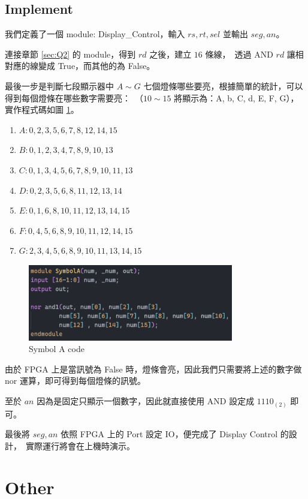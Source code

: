 \documentclass[10.5pt,compsoc,UTF8]{CjC}
\theoremstyle{mystyle}
\begin{document}
\subsection{Implement}
我們定義了一個 module: Display\_Control，輸入 $rs, rt, sel$ 並輸出 $seg, an$。\ 
\par
連接章節 \ref{sec:Q2} 的 module，得到 $rd$ 之後，建立 $16$ 條線，\
透過 AND $rd$ 讓相對應的線變成 True，而其他的為 False。
\par
最後一步是判斷七段顯示器中 $A \sim G$ 七個燈條哪些要亮，根據簡單的統計，可以得到每個燈條在哪些數字需要亮：\
（$10 \sim 15$ 將顯示為：A, b, C, d, E, F, G），實作程式碼如圖 \ref{fig:SymbolA}。
\begin{enumerate}
  \item $A: 0, 2, 3, 5, 6, 7, 8, 12, 14, 15$
  \item $B: 0, 1, 2, 3, 4, 7, 8, 9, 10, 13$
  \item $C: 0, 1, 3, 4, 5, 6, 7, 8, 9, 10, 11, 13$
  \item $D: 0, 2, 3, 5, 6, 8, 11, 12, 13, 14$
  \item $E: 0, 1, 6, 8, 10, 11, 12, 13, 14, 15$
  \item $F: 0, 4, 5, 6, 8, 9, 10, 11, 12, 14, 15$
  \item $G: 2, 3, 4, 5, 6, 8, 9, 10, 11, 13, 14, 15$ 
\end{enumerate}

\begin{figure}[h]
    \centering
    \includegraphics[width=0.8\textwidth]{SymbolA.png}
    \caption{Symbol A code}
    \label{fig:SymbolA}
\end{figure}

由於 FPGA 上是當訊號為 False 時，燈條會亮，因此我們只需要將上述的數字做 nor 運算，即可得到每個燈條的訊號。

至於 $an$ 因為是固定只顯示一個數字，因此就直接使用 AND 設定成 $1110_{(2)}$ 即可。


最後將 $seg, an$ 依照 FPGA 上的 Port 設定 IO，便完成了 Display Control 的設計，\ 
實際運行將會在上機時演示。

\newpage
\section{Other}
\end{document}
